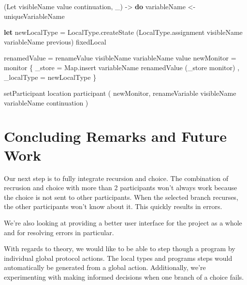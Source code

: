 \documentclass[runningheads]{llncs}
\newenvironment{Shaded}{}{}
\newcommand{\KeywordTok}[1]{\textcolor[rgb]{0.00,0.44,0.13}{\textbf{#1}}}
\newcommand{\DataTypeTok}[1]{\textcolor[rgb]{0.56,0.13,0.00}{#1}}
\newcommand{\OtherTok}[1]{\textcolor[rgb]{0.00,0.44,0.13}{#1}}
\newcommand{\FunctionTok}[1]{\textcolor[rgb]{0.02,0.16,0.49}{#1}}
\newcommand{\NormalTok}[1]{#1}
\begin{document}
\begin{Shaded}
\begin{Highlighting}[]
\NormalTok{(}\DataTypeTok{Let}\NormalTok{ visibleName value continuation, _) }\OtherTok{->} \KeywordTok{do}
\NormalTok{    variableName }\OtherTok{<-}\NormalTok{ uniqueVariableName }

    \KeywordTok{let}\NormalTok{ newLocalType }\FunctionTok{=} 
\NormalTok{            LocalType.createState }
\NormalTok{                (LocalType.assignment visibleName variableName previous) }
\NormalTok{                fixedLocal}

\NormalTok{        renamedValue }\FunctionTok{=}\NormalTok{ renameValue visibleName variableName value}
\NormalTok{        newMonitor }\FunctionTok{=} 
\NormalTok{            monitor }
\NormalTok{                \{ _store }\FunctionTok{=}\NormalTok{ Map.insert variableName renamedValue (_store monitor)}
\NormalTok{                , _localType }\FunctionTok{=}\NormalTok{ newLocalType}
\NormalTok{                \}  }
    
\NormalTok{    setParticipant location participant }
\NormalTok{        ( newMonitor, renameVariable visibleName variableName continuation )}
\end{Highlighting}
\end{Shaded}

\section{Concluding Remarks and Future
Work}\label{concluding-remarks-and-future-work}

Our next step is to fully integrate recursion and choice. The
combination of recrusion and choice with more than 2 participants won't
always work because the choice is not sent to other participants. When
the selected branch recurses, the other participants won't know about
it. This quickly results in errors.

We're also looking at providing a better user interface for the project
as a whole and for resolving errors in particular.

With regards to theory, we would like to be able to step though a
program by individual global protocol actions. The local types and
programs steps would automatically be generated from a global action.
Additionally, we're experimenting with making informed decisions when
one branch of a choice fails.
%
%
%
% 
 
 
%
\end{document}
